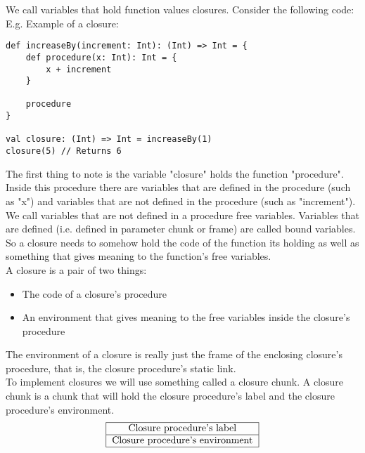 \documentclass[12pt, letterpaper]{article}
\begin{document}
We call variables that hold function values closures. Consider the following code:\\

E.g. Example of a closure:
\begin{lstlisting}
def increaseBy(increment: Int): (Int) => Int = {
	def procedure(x: Int): Int = {
		x + increment
	}
	
	procedure
}

val closure: (Int) => Int = increaseBy(1)
closure(5) // Returns 6
\end{lstlisting}

The first thing to note is the variable "closure" holds the function "procedure". Inside this procedure there are variables that are defined in the procedure (such as "x") and variables that are not defined in the procedure (such as "increment").\\

We call variables that are not defined in a procedure free variables. Variables that are defined (i.e. defined in parameter chunk or frame) are called bound variables.\\

So a closure needs to somehow hold the code of the function its holding as well as something that gives meaning to the function's free variables.\\

A closure is a pair of two things:
\begin{itemize}
\item The code of a closure's procedure
\item An environment that gives meaning to the free variables inside the closure's procedure
\end{itemize}

The environment of a closure is really just the frame of the enclosing closure's procedure, that is, the closure procedure's static link.\\

To implement closures we will use something called a closure chunk. A closure chunk is a chunk that will hold the closure procedure's label and the closure procedure's environment.\\

\[
\begin{tabular}{|c|}
\hline
Closure procedure's label\\
\hline
Closure procedure's environment\\
\hline
\end{tabular}
\]\\
\end{document}
